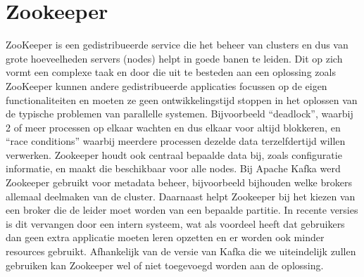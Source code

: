 \section{Zookeeper}
ZooKeeper is een gedistribueerde service die het beheer van clusters en dus van grote hoeveelheden servers (nodes) helpt in goede banen te leiden. Dit op zich vormt een complexe taak en door die uit te besteden aan een oplossing zoals ZooKeeper kunnen andere gedistribueerde applicaties focussen op de eigen functionaliteiten en moeten ze geen ontwikkelingstijd stoppen in het oplossen van de typische problemen van parallelle systemen. Bijvoorbeeld ``deadlock'', waarbij 2 of meer processen op elkaar wachten en dus elkaar voor altijd blokkeren, en ``race conditions'' waarbij meerdere processen dezelde data terzelfdertijd willen verwerken. 
Zookeeper houdt ook centraal bepaalde data bij, zoals configuratie informatie, en maakt die beschikbaar voor alle nodes.\autocite{ASF2023}
\newline
\newline 
Bij Apache Kafka werd Zookeeper gebruikt voor metadata beheer, bijvoorbeeld bijhouden welke brokers allemaal deelmaken van de cluster. Daarnaast helpt Zookeeper bij het kiezen van een broker die de leider moet worden van een bepaalde partitie. In recente versies is dit vervangen door een intern systeem, wat als voordeel heeft dat gebruikers dan geen extra applicatie moeten leren opzetten en er worden ook minder resources gebruikt.
\autocite{Conduktor2023}
\newline
\newline
Afhankelijk van de versie van Kafka die we uiteindelijk zullen gebruiken kan Zookeeper wel of niet toegevoegd worden aan de oplossing.
\newline
\newline

